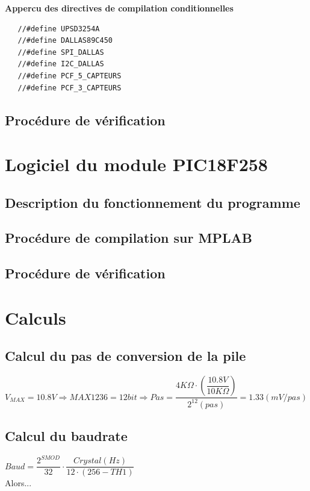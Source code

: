 \documentclass[10pt,a4paper,final]{article}
\begin{document}
\textbf{Appercu des directives de compilation conditionnelles}
\begin{lstlisting}
   //#define UPSD3254A
   //#define DALLAS89C450
   //#define SPI_DALLAS
   //#define I2C_DALLAS
   //#define PCF_5_CAPTEURS
   //#define PCF_3_CAPTEURS
\end{lstlisting}
\begin{spacing}{1.5}
\subsection{Procédure de vérification}

\pagebreak
\section{Logiciel du module PIC18F258}
\subsection{Description du fonctionnement du programme}

\subsection{Procédure de compilation sur MPLAB}

\subsection{Procédure de vérification}

\pagebreak
\section{Calculs}
\subsection{Calcul du pas de conversion de la pile}
$V_{MAX}=10.8V \Rightarrow MAX1236  = 12 bit \Rightarrow Pas = \dfrac{4K\Omega \cdot \left(\dfrac{10.8V}{10K\Omega}\right)}{2^{12}(pas)} = 1.33(mV/pas)$
\subsection{Calcul du baudrate}
$Baud = \dfrac{2^{SMOD}}{32}\cdot\dfrac{Crystal (Hz)}{12\cdot(256 - TH1)}$\\


Alors...\\



\end{spacing}
\end{document}
